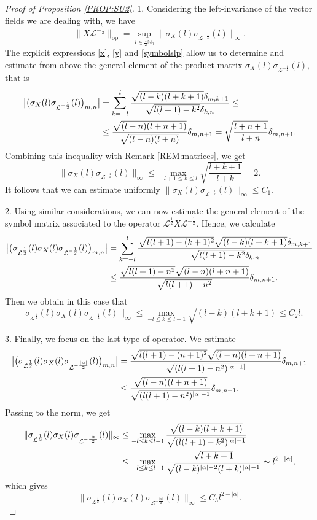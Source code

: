 \documentclass[12pt,oneside,a4paper]{book}
\numberwithin{equation}{section}     %
\theoremstyle{plain}
\theoremstyle{definition}
\DeclareMathOperator{\OP}{op}
\newcommand{\N}{{\mathbb N}}
\newcommand{\slp}{{\mathcal L}}
\begin{document}
\begin{proof}[Proof of Proposition \ref{PROP:SU2}]
	1. Considering the left-invariance of the vector fields we are dealing with, we have 
	\[
	\|X\slp^{-\frac{1}{2}}\|_{\OP}=\sup_{l\in\frac{1}{2}\N_0}\|\sigma_{X}(l)\sigma_{\slp^{-\frac{1}{2}}}(l)\|_{\infty}.
	\]  
	The explicit expressions \eqref{x}, \eqref{y} and \eqref{symbolslp} allow us to determine and estimate from above the general element of the product matrix $\sigma_{X}(l)\sigma_{\slp^{-\frac{1}{2}}}(l)$, that is
	\begin{align}\notag
	\big|\big(\sigma_{X}(l)\sigma_{\slp^{-\frac{1}{2}}}(l)\big)_{m,n}\big|&=\sum_{k=-l}^l \frac{\sqrt{(l-k)(l+k+1)}\delta_{m,k+1}}{\sqrt{l(l+1)-k^2}\delta_{k,n}}\leq\\\notag
	&\leq\frac{\sqrt{(l-n)(l+n+1)}}{\sqrt{(l-n)(l+n)}}\delta_{m,n+1}=\sqrt{\frac{l+n+1}{l+n}}\delta_{m,n+1}.
	\end{align} 
	Combining this inequality with Remark \ref{REM:matrices}, we get
	\[
	\|\sigma_X(l)\sigma_{\slp^{-\frac{1}{2}}}(l)\|_{\infty}\leq \max_{-l+1\leq k\leq l}\sqrt{\frac{l+k+1}{l+k}}=2.
	\]
	It follows that we can estimate uniformly $\|\sigma_{X}(l)\sigma_{\slp^{-\frac{1}{2}}}(l)\|_{\infty}\leq C_1$.
	
	2. Using similar considerations, we can now estimate the general element of the symbol matrix associated to the operator $\slp^\frac{1}{2}X\slp^{-\frac{1}{2}}$. Hence, we calculate
	\begin{align}\notag 
	\big|\big(\sigma_{\slp^\frac{1}{2}}(l)\sigma_X(l)\sigma_{\slp^{-\frac{1}{2}}}(l)\big)_{m,n}\big|&=\sum_{k=-l}^l \frac{\sqrt{l(l+1)-(k+1)^2}\sqrt{(l-k)(l+k+1)}\delta_{m,k+1}}{\sqrt{l(l+1)-k^2}\delta_{k,n}}\\\notag
	&\leq\frac{\sqrt{l(l+1)-n^2}\sqrt{(l-n)(l+n+1)}}{\sqrt{l(l+1)-n^2}}\delta_{m,n+1}.
	\end{align} 
	Then we obtain in this case that 
	\[
	\|\sigma_{\slp^\frac{1}{2}}(l)\sigma_X(l)\sigma_{\slp^{-\frac{1}{2}}}(l)\|_{\infty}\leq\max_{-l\leq k\leq l-1}\sqrt{(l-k)(l+k+1)}\leq C_2 l.
	\]
	
	3. Finally, we focus on the last type of operator. We estimate
	\begin{align}\notag
	\big|\big(\sigma_{\slp^\frac{1}{2}}(l)\sigma_{X}(l)\sigma_{\slp^{-\frac{|\alpha|}{2}}}(l) \big)_{m,n}\big|&=\frac{\sqrt{l(l+1)-(n+1)^2}\sqrt{(l-n)(l+n+1)}}{\sqrt{(l(l+1)-n^2)^{|\alpha-1|}}}\delta_{m,n+1}\\\notag
	&\leq\frac{\sqrt{(l-n)(l+n+1)}}{\sqrt{(l(l+1)-n^2)^{|\alpha|-1}}}\delta_{m,n+1}.
	\end{align}
	Passing to the norm, we get
	\begin{align}\notag
	\|\sigma_{\slp^\frac{1}{2}}(l)\sigma_{X}(l)\sigma_{\slp^{-\frac{|\alpha|}{2}}}(l)\|_{\infty}&\leq\max_{-l\leq k\leq l-1}\frac{\sqrt{(l-k)(l+k+1)}}{\sqrt{(l(l+1)-k^2)^{|\alpha|-1}}}\\\notag
	&\leq \max_{-l\leq k\leq l-1}\frac{\sqrt{l+k+1}}{\sqrt{(l-k)^{|\alpha|-2}(l+k)^{|\alpha|-1}}}\sim l^{2-|\alpha|},
	\end{align}
	which gives
	\[
	\|\sigma_{\slp^\frac{1}{2}}(l)\sigma_{X}(l)\sigma_{\slp^{-\frac{|\alpha|}{2}}}(l)\|_{\infty}\leq C_3 l^{2-|\alpha|}.
	\]
	

\end{proof}
\end{document}
